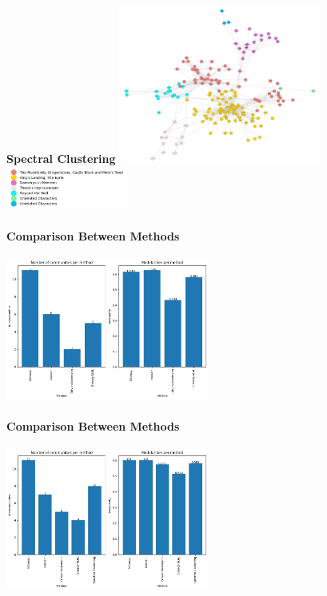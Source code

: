 \documentclass[10pt,twocolumn,letterpaper]{article}
\begin{document}
\begin{center}
    \textbf{Spectral Clustering}
    \includegraphics[width=0.5\textwidth]{img/s4/communities_sc.jpg}
    \includegraphics[width=0.3\textwidth]{img/s4/sc_legend.jpg}\\
    \caption{\small{$\#communities=7$, $modularity=0.581$}}
\end{center}

\paragraph{Comparison Between Methods}

\begin{center}
    \includegraphics[width=0.5\textwidth]{img/s3/communities_comparison.jpg}
\end{center}


\paragraph{Comparison Between Methods}

\begin{center}
    \includegraphics[width=0.5\textwidth]{img/s4/communities_comparison.jpg}
\end{center}
\end{document}

